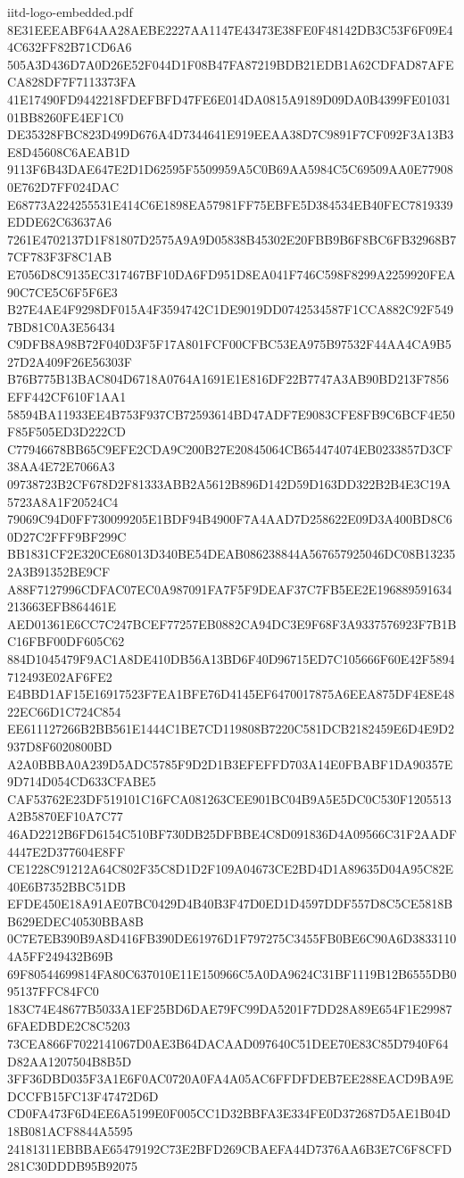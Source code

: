\begin{filecontents*}[overwrite]{iitd-logo-embedded.pdf}
8E31EEEABF64AA28AEBE2227AA1147E43473E38FE0F48142DB3C53F6F09E44C632FF82B71CD6A6
505A3D436D7A0D26E52F044D1F08B47FA87219BDB21EDB1A62CDFAD87AFECA828DF7F7113373FA
41E17490FD9442218FDEFBFD47FE6E014DA0815A9189D09DA0B4399FE0103101BB8260FE4EF1C0
DE35328FBC823D499D676A4D7344641E919EEAA38D7C9891F7CF092F3A13B3E8D45608C6AEAB1D
9113F6B43DAE647E2D1D62595F5509959A5C0B69AA5984C5C69509AA0E779080E762D7FF024DAC
E68773A224255531E414C6E1898EA57981FF75EBFE5D384534EB40FEC7819339EDDE62C63637A6
7261E4702137D1F81807D2575A9A9D05838B45302E20FBB9B6F8BC6FB32968B77CF783F3F8C1AB
E7056D8C9135EC317467BF10DA6FD951D8EA041F746C598F8299A2259920FEA90C7CE5C6F5F6E3
B27E4AE4F9298DF015A4F3594742C1DE9019DD0742534587F1CCA882C92F5497BD81C0A3E56434
C9DFB8A98B72F040D3F5F17A801FCF00CFBC53EA975B97532F44AA4CA9B527D2A409F26E56303F
B76B775B13BAC804D6718A0764A1691E1E816DF22B7747A3AB90BD213F7856EFF442CF610F1AA1
58594BA11933EE4B753F937CB72593614BD47ADF7E9083CFE8FB9C6BCF4E50F85F505ED3D222CD
C77946678BB65C9EFE2CDA9C200B27E20845064CB654474074EB0233857D3CF38AA4E72E7066A3
09738723B2CF678D2F81333ABB2A5612B896D142D59D163DD322B2B4E3C19A5723A8A1F20524C4
79069C94D0FF730099205E1BDF94B4900F7A4AAD7D258622E09D3A400BD8C60D27C2FFF9BF299C
BB1831CF2E320CE68013D340BE54DEAB086238844A567657925046DC08B132352A3B91352BE9CF
A88F7127996CDFAC07EC0A987091FA7F5F9DEAF37C7FB5EE2E196889591634213663EFB864461E
AED01361E6CC7C247BCEF77257EB0882CA94DC3E9F68F3A9337576923F7B1BC16FBF00DF605C62
884D1045479F9AC1A8DE410DB56A13BD6F40D96715ED7C105666F60E42F5894712493E02AF6FE2
E4BBD1AF15E16917523F7EA1BFE76D4145EF6470017875A6EEA875DF4E8E4822EC66D1C724C854
EE611127266B2BB561E1444C1BE7CD119808B7220C581DCB2182459E6D4E9D2937D8F6020800BD
A2A0BBBA0A239D5ADC5785F9D2D1B3EFEFFD703A14E0FBABF1DA90357E9D714D054CD633CFABE5
CAF53762E23DF519101C16FCA081263CEE901BC04B9A5E5DC0C530F1205513A2B5870EF10A7C77
46AD2212B6FD6154C510BF730DB25DFBBE4C8D091836D4A09566C31F2AADF4447E2D377604E8FF
CE1228C91212A64C802F35C8D1D2F109A04673CE2BD4D1A89635D04A95C82E40E6B7352BBC51DB
EFDE450E18A91AE07BC0429D4B40B3F47D0ED1D4597DDF557D8C5CE5818BB629EDEC40530BBA8B
0C7E7EB390B9A8D416FB390DE61976D1F797275C3455FB0BE6C90A6D38331104A5FF249432B69B
69F80544699814FA80C637010E11E150966C5A0DA9624C31BF1119B12B6555DB095137FFC84FC0
183C74E48677B5033A1EF25BD6DAE79FC99DA5201F7DD28A89E654F1E299876FAEDBDE2C8C5203
73CEA866F7022141067D0AE3B64DACAAD097640C51DEE70E83C85D7940F64D82AA1207504B8B5D
3FF36DBD035F3A1E6F0AC0720A0FA4A05AC6FFDFDEB7EE288EACD9BA9EDCCFB15FC13F47472D6D
CD0FA473F6D4EE6A5199E0F005CC1D32BBFA3E334FE0D372687D5AE1B04D18B081ACF8844A5595
24181311EBBBAE65479192C73E2BFD269CBAEFA44D7376AA6B3E7C6F8CFD281C30DDDB95B92075

\end{filecontents*}

